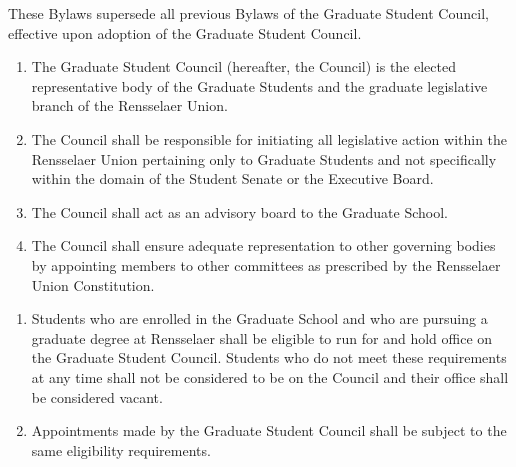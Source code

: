 \documentclass{uniondoc}
\begin{document}

These Bylaws supersede all previous Bylaws of the Graduate Student Council, effective upon adoption of the Graduate Student Council.



\begin{enumerate}
\item The Graduate Student Council (hereafter, the Council) is the elected representative body of the Graduate Students and the graduate legislative branch of the Rensselaer Union.
\item The Council shall be responsible for initiating all legislative action within the Rensselaer Union pertaining only to Graduate Students and not specifically within the domain of the Student Senate or the Executive Board.
\item The Council shall act as an advisory board to the Graduate School.
\item The Council shall ensure adequate representation to other governing bodies by appointing members to other committees as prescribed by the Rensselaer Union Constitution.
\end{enumerate}


\begin{enumerate}
\item Students who are enrolled in the Graduate School and who are pursuing a graduate degree at Rensselaer shall be eligible to run for and hold office on the Graduate Student Council. Students who do not meet these requirements at any time shall not be considered to be on the Council and their office shall be considered vacant.
\item Appointments made by the Graduate Student Council shall be subject to the same eligibility requirements.
\end{enumerate}

\end{document}
